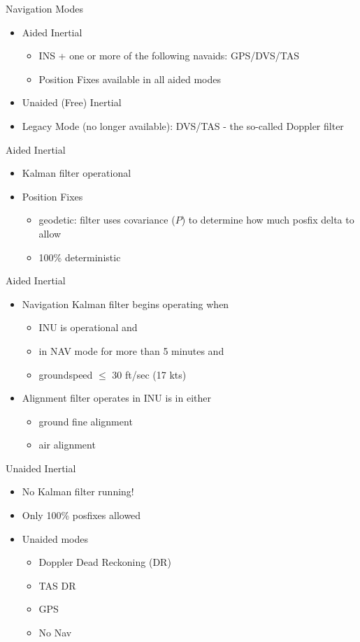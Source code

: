 \begin{frame}
Navigation Modes
 \begin{itemize}
 \item Aided Inertial
	\begin{itemize}
		\item INS + one or more of the following navaids: GPS/DVS/TAS
		\item Position Fixes available in all aided modes
	\end{itemize}
 \item Unaided (Free) Inertial
 \item Legacy Mode (no longer available): DVS/TAS - the so-called Doppler filter 
\end{itemize}
\end{frame}

\begin{frame}
Aided Inertial
\begin{itemize}
  \item Kalman filter operational
  \item Position Fixes
	\begin{itemize}
		\item geodetic: filter uses covariance ($P$) to determine how much posfix delta to allow
		\item 100\% deterministic 
	\end{itemize}
\end{itemize} 
\end{frame}
\begin{frame}
Aided Inertial
\begin{itemize}
  \item Navigation Kalman filter begins operating when
	\begin{itemize}
		\item INU is operational and 
		\item in NAV mode for more than 5 minutes and
		\item groundspeed $\leq$ 30 ft/sec (17 kts)
	\end{itemize}
	\item Alignment filter operates in INU is in either
	\begin{itemize}
		\item ground fine alignment
		\item air alignment
	\end{itemize}
\end{itemize} 
\end{frame}


\begin{frame}
Unaided Inertial
\begin{itemize}
  \item No Kalman filter running!
  \item Only 100\% posfixes allowed
  \item Unaided modes
	\begin{itemize}
		\item Doppler Dead Reckoning (DR) 
		\item TAS DR
		\item GPS
		\item No Nav
	\end{itemize}
\end{itemize} 
\end{frame}
